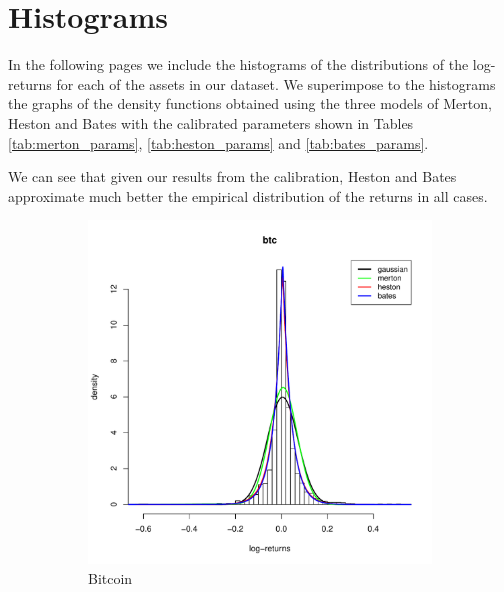 \chapter{Histograms}
\label{app:hist}

In the following pages we include the histograms of the distributions of the log-returns for each of the assets in our dataset. We superimpose to the histograms the graphs of the density functions obtained using the three models of Merton, Heston and Bates with the calibrated parameters shown in Tables \ref{tab:merton_params}, \ref{tab:heston_params} and \ref{tab:bates_params}.

We can see that given our results from the calibration, Heston and Bates approximate much better the empirical distribution of the returns in all cases.

\begin{figure}
	\small
	\centering
	\begin{subfigure}{0.44\textwidth}
		\centering
		\includegraphics[width=\linewidth]{Images/hist_btc.pdf}
		\caption{Bitcoin}
	\end{subfigure}
	\begin{subfigure}{0.44\textwidth}
		\centering

\end{subfigure}
\end{figure}
